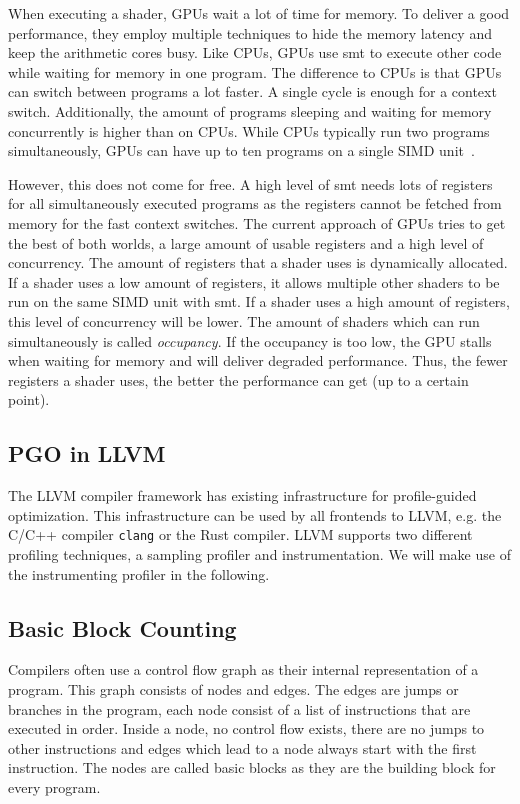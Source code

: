 When executing a shader, GPUs wait a lot of time for memory. To deliver a good performance, they employ multiple techniques to hide the memory latency and keep the arithmetic cores busy.
Like CPUs, GPUs use \gls{smt} to execute other code while waiting for memory in one program.
The difference to CPUs is that GPUs can switch between programs a lot faster. A single cycle is enough for a context switch.
Additionally, the amount of programs sleeping and waiting for memory concurrently is higher than on CPUs.
While CPUs typically run two programs simultaneously, GPUs can have up to ten programs on a single SIMD unit~\cite{Aaltonen2017}.

However, this does not come for free. A high level of \gls{smt} needs lots of registers for all simultaneously executed programs as the registers cannot be fetched from memory for the fast context switches.
The current approach of GPUs tries to get the best of both worlds, a large amount of usable registers and a high level of concurrency.
The amount of registers that a shader uses is dynamically allocated.
If a shader uses a low amount of registers, it allows multiple other shaders to be run on the same SIMD unit with \gls{smt}.
If a shader uses a high amount of registers, this level of concurrency will be lower.
The amount of shaders which can run simultaneously is called \emph{occupancy}.
If the occupancy is too low, the GPU stalls when waiting for memory and will deliver degraded performance.
Thus, the fewer registers a shader uses, the better the performance can get (up to a certain point).

\subsection{PGO in LLVM}
\label{sub:pgo-background}
The LLVM compiler framework has existing infrastructure for profile-guided optimization. This infrastructure can be used by all frontends to LLVM, e.g. the C/C++ compiler \texttt{clang} or the Rust compiler. LLVM supports two different profiling techniques, a sampling profiler and instrumentation. We will make use of the instrumenting profiler in the following.

\subsection{Basic Block Counting}
\label{sub:counter-instrumentation}
Compilers often use a control flow graph as their internal representation of a program.
This graph consists of nodes and edges. The edges are jumps or branches in the program, each node consist of a list of instructions that are executed in order.
Inside a node, no control flow exists, there are no jumps to other instructions and edges which lead to a node always start with the first instruction.
The nodes are called basic blocks as they are the building block for every program.

